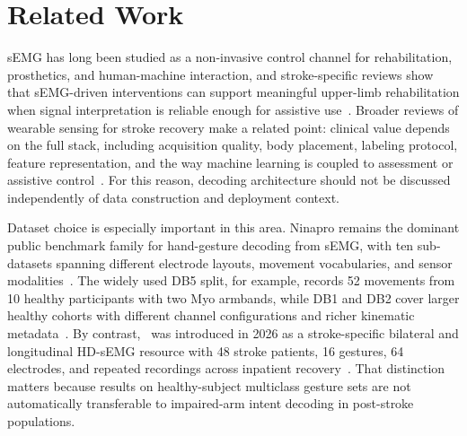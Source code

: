 \section{Related Work}

sEMG has long been studied as a non-invasive control channel for rehabilitation, prosthetics, and human-machine interaction, and stroke-specific reviews show that sEMG-driven interventions can support meaningful upper-limb rehabilitation when signal interpretation is reliable enough for assistive use~\citep{munoznovoa2022upper,zheng2021semg}. Broader reviews of wearable sensing for stroke recovery make a related point: clinical value depends on the full stack, including acquisition quality, body placement, labeling protocol, feature representation, and the way machine learning is coupled to assessment or assistive control~\citep{boukhennoufa2022wearable}. For this reason, decoding architecture should not be discussed independently of data construction and deployment context.

Dataset choice is especially important in this area. Ninapro remains the dominant public benchmark family for hand-gesture decoding from sEMG, with ten sub-datasets spanning different electrode layouts, movement vocabularies, and sensor modalities~\citep{ninapro2014,ninaproSite2026}. The widely used DB5 split, for example, records 52 movements from 10 healthy participants with two Myo armbands, while DB1 and DB2 cover larger healthy cohorts with different channel configurations and richer kinematic metadata~\citep{ninapro2014,ninaproSite2026}. By contrast, \physiomio\ was introduced in 2026 as a stroke-specific bilateral and longitudinal HD-sEMG resource with 48 stroke patients, 16 gestures, 64 electrodes, and repeated recordings across inpatient recovery~\citep{physiomioData2026}. That distinction matters because results on healthy-subject multiclass gesture sets are not automatically transferable to impaired-arm intent decoding in post-stroke populations.

